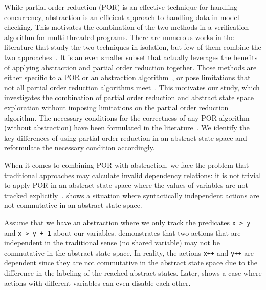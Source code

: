 \documentclass[numbook]{svjour3}
\begin{document}
While partial order reduction (POR) is an effective technique for handling concurrency, abstraction is an efficient approach to handling data in model checking. This motivates the combination of the two methods in a verification algorithm for multi-threaded programs. There are numerous works in the literature that study the two techniques in isolation, but few of them combine the two approaches~\cite{farzan_sound_sequentialization,por_abstraction_timed_automata}. It is an even smaller subset that actually leverages the benefits of applying abstraction and partial order reduction together. Those methods are either specific to a POR or an abstraction algorithm~\cite{fbk_por_abstraction,impact_por_abstraction,abpress,sousa_abstract_unfoldings}, or pose limitations that not all partial order reduction algorithms meet~\cite{farzan_stratified_commutativity,hansen_diamonds}. This motivates our study, which investigates the combination of partial order reduction and abstract state space exploration without imposing limitations on the partial order reduction algorithm. The necessary conditions for the correctness of any POR algorithm (without abstraction) have been formulated in the literature~\cite{source_set_foundation}. We identify the key differences of using partial order reduction in an abstract state space and reformulate the necessary condition accordingly.

When it comes to combining POR with abstraction, we face the problem that traditional approaches may calculate invalid dependency relations: it is not trivial to apply POR in an abstract state space where the values of variables are not tracked explicitly~\cite{fbk_por_abstraction,sousa_abstractions_independence}.  shows a situation where syntactically independent actions are not commutative in an abstract state space.

\begin{example}
	\label{example:por-traditional-dependency-wrong}
	Assume that we have an abstraction where we only track the predicates \texttt{x~>~y} and \texttt{x~>~y~+~1} about our variables.  demonstrates that two actions that are independent in the traditional sense (no shared variable) may not be commutative in the abstract state space. In reality, the actions \texttt{x++} and \texttt{y++} are dependent since they are not commutative in the abstract state space due to the difference in the labeling of the reached abstract states. Later,  shows a case where actions with different variables can even disable each other.
\end{example}
\end{document}
